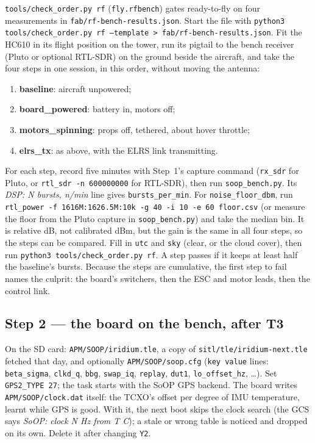 \documentclass[11pt,a4paper]{article}
\newcommand{\file}[1]{\texttt{\small #1}}
\newcommand{\cmd}[1]{\texttt{\small #1}}
\begin{document}
\file{tools/check\_order.py rf} (\file{fly.rfbench}) gates ready-to-fly on four measurements in
\file{fab/rf-bench-results.json}. Start the file with
\cmd{python3 tools/check\_order.py rf --template > fab/rf-bench-results.json}. Fit the HC610 in its
flight position on the tower, run its pigtail to the bench receiver (Pluto or optional RTL-SDR)
on the ground beside the aircraft, and take the four steps in one session, in this order, without moving the antenna:

\begin{enumerate}
\item \textbf{baseline}: aircraft unpowered;
\item \textbf{board\_powered}: battery in, motors off;
\item \textbf{motors\_spinning}: props off, tethered, about hover throttle;
\item \textbf{elrs\_tx}: as above, with the ELRS link transmitting.
\end{enumerate}

For each step, record five minutes with Step~1's capture command (\cmd{rx\_sdr} for Pluto, or
\cmd{rtl\_sdr -n 600000000} for RTL-SDR), then run \file{soop\_bench.py}. Its \emph{DSP: N bursts, n/min}
line gives \file{bursts\_per\_min}. For \file{noise\_floor\_dbm}, run
\cmd{rtl\_power -f 1616M:1626.5M:10k -g 40 -i 10 -e 60 floor.csv} (or measure the floor from the
Pluto capture in \file{soop\_bench.py}) and take the median bin. It is relative dB, not calibrated dBm,
but the gain is the same in all four steps, so the steps can be compared.
Fill in \file{utc} and \file{sky} (clear, or the cloud cover), then run \cmd{python3 tools/check\_order.py rf}.
A step passes if it keeps at least half the baseline's bursts. Because the steps are cumulative,
the first step to fail names the culprit: the board's switchers, then the ESC and motor leads,
then the control link.

\subsection{Step 2 --- the board on the bench, after T3}

On the SD card: \file{APM/SOOP/iridium.tle}, a copy of \file{sitl/tle/iridium-next.tle}
fetched that day, and optionally \file{APM/SOOP/soop.cfg} (\file{key value} lines:
\file{beta\_sigma}, \file{clkd\_q}, \file{bbg}, \file{swap\_iq}, \file{replay},
\file{dut1}, \file{lo\_offset\_hz}, \dots). Set \file{GPS2\_TYPE 27}; the task starts with the SoOP GPS backend.
The board writes \file{APM/SOOP/clock.dat} itself: the TCXO's offset per degree of IMU
temperature, learnt while GPS is good. With it, the next boot skips the clock search (the GCS
says \emph{SoOP: clock N Hz from T C}); a stale or wrong table is noticed and dropped on its
own. Delete it after changing \file{Y2}.
\end{document}
